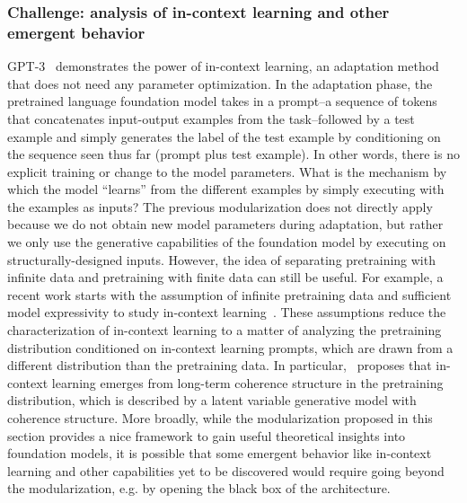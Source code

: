\subsubsection{Challenge: analysis of in-context learning and other emergent behavior}
\label{sec:theory-incontext}
GPT-3~\citep{brown2020gpt3} demonstrates the power of in-context learning, an adaptation method that does not need any parameter optimization. In the adaptation phase, the pretrained language foundation model takes in a prompt--a sequence of tokens that concatenates input-output examples from the task--followed by a test example and simply generates the label of the test example by conditioning on the sequence seen thus far (prompt plus test example). In other words, there is no explicit training or change to the model parameters. What is the mechanism by which the model ``learns'' from the different examples by simply executing with the examples as inputs? The previous modularization does not directly apply because we do not obtain new model parameters during adaptation, but rather we only use the generative capabilities of the foundation model by executing on structurally-designed inputs. However, the idea of separating pretraining with infinite data and pretraining with finite data can still be useful. For example, a recent work starts with the assumption of infinite pretraining data and sufficient model expressivity to study in-context learning~\citep{xie2021incontext}. These assumptions reduce the characterization of in-context learning to a matter of analyzing the pretraining distribution conditioned on in-context learning prompts, which are drawn from a different distribution than the pretraining data. In particular,~\citet{xie2021incontext} proposes that in-context learning emerges from long-term coherence structure in the pretraining distribution, which is described by a latent variable generative model with coherence structure. More broadly, while the modularization proposed in this section provides a nice framework to gain useful theoretical insights into foundation models, it is possible that some emergent behavior like in-context learning and other capabilities yet to be discovered would require going beyond the modularization, e.g. by opening the black box of the architecture.

